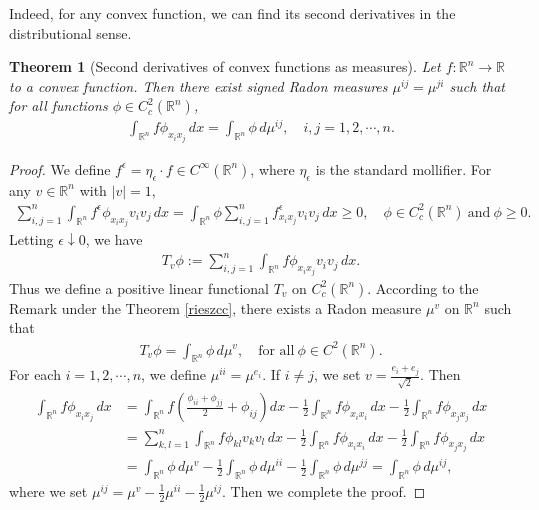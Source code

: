 \documentclass{article}
\numberwithin{equation}{section}
\newcommand{\bbR}{\mathbb{R}}
\theoremstyle{plain}
\newtheorem{theorem}{Theorem}[section]
\theoremstyle{definition}
\begin{document}
Indeed, for any convex function, we can find its second derivatives in the distributional sense.
\begin{theorem}[Second derivatives of convex functions as measures]
	Let $f:\bbR^n\to\bbR$ to a convex function. Then there exist signed Radon measures $\mu^{ij}=\mu^{ji}$ such that for all functions $\phi\in C_c^2(\bbR^n)$,
	\begin{align*}
		\int_{\bbR^n}f\phi_{x_ix_j}\,dx=\int_{\bbR^n}\phi\,d\mu^{ij},\quad i,j=1,2,\cdots,n.
	\end{align*}
\end{theorem}
\begin{proof}
	We define $f^\epsilon=\eta_\epsilon\cdot f\in C^\infty(\bbR^n)$, where $\eta_\epsilon$ is the standard mollifier. For any $v\in\bbR^n$ with $\vert v\vert=1$,
	\begin{align*}
		\sum_{i,j=1}^n\int_{\bbR^n}f^\epsilon\phi_{x_ix_j}v_iv_j\,dx=\int_{\bbR^n}\phi\sum_{i,j=1}^nf^\epsilon_{x_ix_j} v_iv_j\,dx\geq 0,\quad \phi\in C^2_c(\bbR^n)\ \text{and}\ \phi\geq 0.
	\end{align*}
	Letting $\epsilon\downarrow 0$, we have \vspace{-0.1cm}
	\begin{align*}
		T_v\phi:=\sum_{i,j=1}^n\int_{\bbR^n}f\phi_{x_ix_j}v_iv_j\,dx.
	\end{align*}
	Thus we define a positive linear functional $T_v$ on $C^2_c(\bbR^n)$. According to the Remark under the Theorem \ref{rieszcc}, there exists a Radon measure $\mu^v$ on $\bbR^n$ such that
	\begin{align*}
		T_v\phi=\int_{\bbR^n}\phi\,d\mu^v,\quad\text{for all}\ \phi\in C^2(\bbR^n).
	\end{align*}
	For each $i=1,2,\cdots,n$, we define $\mu^{ii}=\mu^{e_i}$. If $i\neq j$, we set $v=\frac{e_i+e_j}{\sqrt{2}}$. Then
	\begin{align*}
		\int_{\bbR^n}f\phi_{x_ix_j}\,dx&=\int_{\bbR^n}f\left(\frac{\phi_{ii}+\phi_{jj}}{2}+\phi_{ij}\right)dx-\frac{1}{2}\int_{\bbR^n}f\phi_{x_ix_i}\,dx-\frac{1}{2}\int_{\bbR^n}f\phi_{x_jx_j}\,dx\\
		&=\sum_{k,l=1}^n\int_{\bbR^n}f\phi_{kl}v_kv_l\,dx-\frac{1}{2}\int_{\bbR^n}f\phi_{x_ix_i}\,dx-\frac{1}{2}\int_{\bbR^n}f\phi_{x_jx_j}\,dx\\
		&=\int_{\bbR^n}\phi\,d\mu^v-\frac{1}{2}\int_{\bbR^n}\phi\,d\mu^{ii}-\frac{1}{2}\int_{\bbR^n}\phi\,d\mu^{jj}=\int_{\bbR^n}\phi\,d\mu^{ij},
	\end{align*}
	where we set $\mu^{ij}=\mu^v-\frac{1}{2}\mu^{ii}-\frac{1}{2}\mu^{ij}$. Then we complete the proof.
\end{proof}
\end{document}
